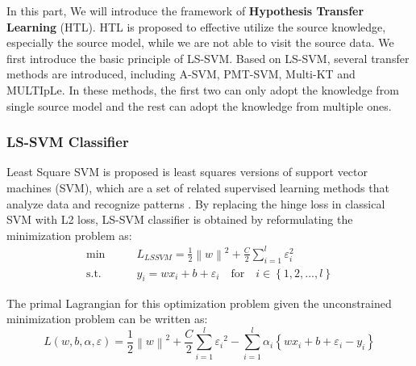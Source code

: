 In this part, We will introduce the framework of \textbf{Hypothesis Transfer Learning} (HTL). HTL is proposed to effective utilize the source knowledge, especially the source model, while we are not able to visit the source data. We first introduce the basic principle of LS-SVM. Based on LS-SVM, several transfer methods are introduced, including A-SVM, PMT-SVM, Multi-KT and MULTIpLe. In these methods, the first two can only adopt the knowledge from single source model and the rest can adopt the knowledge from multiple ones.

\subsubsection{LS-SVM Classifier}

Least Square SVM is proposed is least squares versions of support vector machines (SVM), which are a set of related supervised learning methods that analyze data and recognize patterns \cite{suykens1999least}. By replacing the hinge loss in classical SVM with L2 loss, LS-SVM classifier is obtained by reformulating the minimization problem as: 
\begin{equation}\label{eq:gama:lssvm}
\begin{aligned}
\min \qquad& L_{LSSVM} = \frac{1}{2}{\left\| w \right\|^2} + \frac{C}{2}\sum\limits_{i = 1}^l {{\varepsilon_i ^2}}\\
\text{s.t.}\qquad&{y_i} = w{x_i} + b + {\varepsilon _i} \quad   \text{for} \quad i \in \left\{ {1,2,...,l} \right\}
\end{aligned}
\end{equation}

The primal Lagrangian for this optimization problem given the unconstrained minimization problem can be written as:
\begin{equation}\label{sq:gama:lsprime}
L\left( {w,b,\alpha ,\varepsilon } \right) = \frac{1}{2}{\left\| w \right\|^2} + \frac{C}{2}\sum\limits_{i = 1}^l {{\varepsilon _i}^2}  - \sum\limits_{i = 1}^l {{\alpha _i}\left\{ {w{x_i} + b + {\varepsilon _i} - {y_i}} \right\}}
\end{equation}

